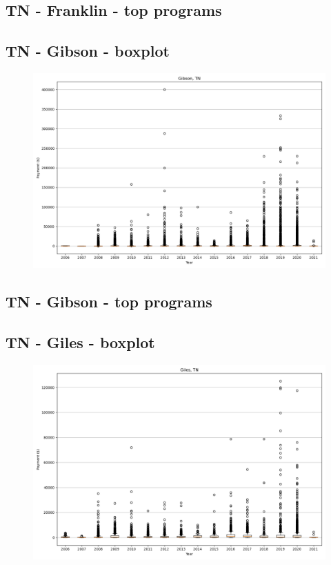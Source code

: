 \subsection*{TN - Franklin - top programs}

\newpage
\subsection*{TN - Gibson - boxplot}
\begin{figure}[h]
\centering
\includegraphics[width=7in]{../output/boxplots/counties/Gibson-TN_boxplot.png}
\end{figure}


\subsection*{TN - Gibson - top programs}

\newpage
\subsection*{TN - Giles - boxplot}
\begin{figure}[h]
\centering
\includegraphics[width=7in]{../output/boxplots/counties/Giles-TN_boxplot.png}
\end{figure}


